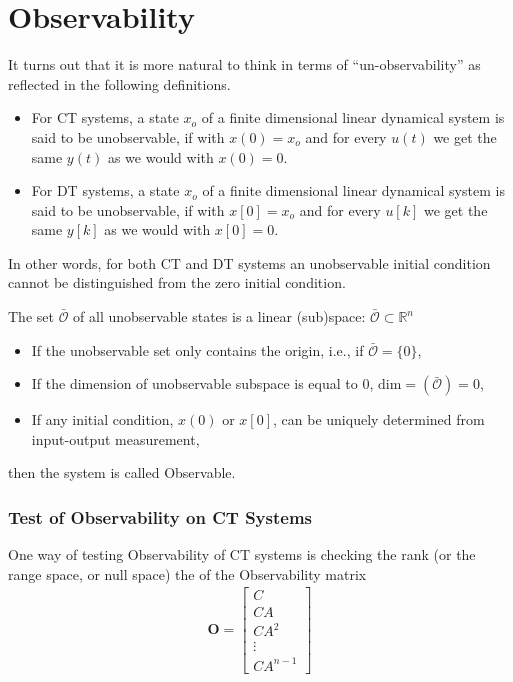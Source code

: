 \documentclass[twoside]{article}
\begin{document}
\section*{Observability}

It turns out that it is more natural to think in terms of
``un-observability'' as reflected in the following definitions.

\begin{itemize}
  \item For CT systems, a state $x_o$ of a finite dimensional linear dynamical
    system is said to be unobservable, if with $x(0) = x_o$ and
    for every $u(t)$ we get the same $y(t)$ as we would with $x(0) =
    0$. 

  \item For DT systems, a state $x_o$ of a finite dimensional linear dynamical
    system is said to be unobservable, if with $x[0] = x_o$ and
    for every $u[k]$ we get the same $y[k]$ as we would with $x[0] =
    0$. 
\end{itemize}

    In other words, for both CT and DT systems an unobservable initial condition cannot be
    distinguished from the zero initial condition.

  The set $\bar{\mathcal{O}}$ of all unobservable states is a linear
  (sub)space: $\bar{\mathcal{O}} \subset \mathbb{R}^n$

\begin{itemize}
%
 \item If the unobservable set only contains the origin, 
   i.e., if $\bar{\mathcal{O}} = \lbrace 0 \rbrace$, 
%
 \item If the dimension of unobservable subspace is equal to 0,
   $\mathrm{dim} = \left( \bar{\mathcal{O}} \right) = 0$,
 \item If any initial condition, $x(0)$ or $x[0]$, can be uniquely 
 determined from input-output measurement,
%
\end{itemize} 
then the system is called Observable. 

\subsubsection*{Test of Observability on CT Systems}

One way of testing Observability of CT systems is checking the rank
(or the range space, or null space) the of the Observability matrix
%
\begin{align*}
  \mathbf{O} =
\left[ \begin{array}{c}
C 
\\
C A
\\
C A^2 
\\
  \vdots
\\
C A^{n-1}
\end{array}
\right] 
\end{align*} 
%
\end{document}
